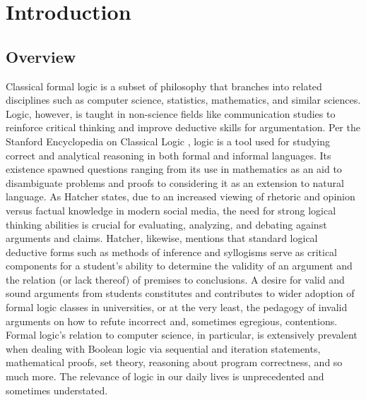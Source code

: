 \documentclass[ms]{uncgdissertationexp2}
\theoremstyle{plain}
\theoremstyle{definition}
\theoremstyle{remark}
\begin{document}
\tableofcontents 
\let\origaddvspace\addvspace
\renewcommand{\addvspace}[1]{}
\listoffigures
\listoftables
\renewcommand{\addvspace}[1]{\origaddvspace{#1}}


\mainmatter %
\chapter{Introduction}\label{chapter:1}
\section{Overview}
Classical formal logic is a subset of philosophy that branches into related disciplines such as computer science, statistics, mathematics, and similar sciences. Logic, however, is taught in non-science fields like communication studies to reinforce critical thinking and improve deductive skills for argumentation. Per the Stanford Encyclopedia on Classical Logic \cite{stanfordencyclopedia}, logic is a tool used for studying correct and analytical reasoning in both formal and informal languages. Its existence spawned questions ranging from its use in mathematics as an aid to disambiguate problems and proofs to considering it as an extension to natural language. As Hatcher \cite{hatcher} states, due to an increased viewing of rhetoric and opinion versus factual knowledge in modern social media, the need for strong logical thinking abilities is crucial for evaluating, analyzing, and debating against arguments and claims. Hatcher, likewise, mentions that standard logical deductive forms such as methods of inference and syllogisms serve as critical components for a student's ability to determine the validity of an argument and the relation (or lack thereof) of premises to conclusions. A desire for valid and sound arguments from students constitutes and contributes to wider adoption of formal logic classes in universities, or at the very least, the pedagogy of invalid arguments on how to refute incorrect and, sometimes egregious, contentions.  Formal logic's relation to computer science, in particular, is extensively prevalent when dealing with Boolean logic via sequential and iteration statements, mathematical proofs, set theory, reasoning about program correctness, and so much more. The relevance of logic in our daily lives is unprecedented and sometimes understated.
\end{document}
